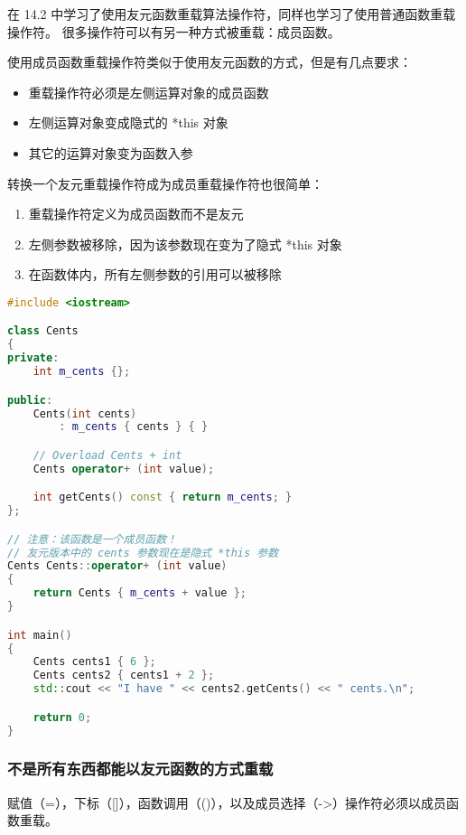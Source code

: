 \documentclass[../../LearnCpp.tex]{subfiles}
\begin{document}

在 14.2 中学习了使用友元函数重载算法操作符，同样也学习了使用普通函数重载操作符。
很多操作符可以有另一种方式被重载：成员函数。

使用成员函数重载操作符类似于使用友元函数的方式，但是有几点要求：

\begin{itemize}
    \item 重载操作符必须是左侧运算对象的成员函数
    \item 左侧运算对象变成隐式的 *this 对象
    \item 其它的运算对象变为函数入参
\end{itemize}

转换一个友元重载操作符成为成员重载操作符也很简单：

\begin{enumerate}
    \item 重载操作符定义为成员函数而不是友元
    \item 左侧参数被移除，因为该参数现在变为了隐式 *this 对象
    \item 在函数体内，所有左侧参数的引用可以被移除
\end{enumerate}

\begin{lstlisting}[language=C++]
#include <iostream>

class Cents
{
private:
    int m_cents {};

public:
    Cents(int cents)
        : m_cents { cents } { }

    // Overload Cents + int
    Cents operator+ (int value);

    int getCents() const { return m_cents; }
};

// 注意：该函数是一个成员函数！
// 友元版本中的 cents 参数现在是隐式 *this 参数
Cents Cents::operator+ (int value)
{
    return Cents { m_cents + value };
}

int main()
{
    Cents cents1 { 6 };
    Cents cents2 { cents1 + 2 };
    std::cout << "I have " << cents2.getCents() << " cents.\n";

    return 0;
}
\end{lstlisting}

\subsubsection*{不是所有东西都能以友元函数的方式重载}

赋值（=），下标（[]），函数调用（()），以及成员选择（->）操作符必须以成员函数重载。
\end{document}
